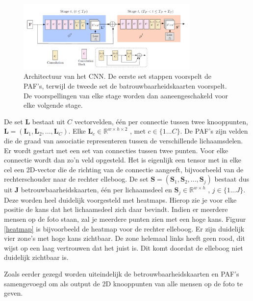 \documentclass[a4paper,twoside,kulak]{kulakreport}
\begin{document}
\begin{figure}[H]
	\centering
	\label{algoritme}
	\includegraphics[width=0.8\textwidth]{algoritme_architectuur}
	\caption{Architectuur van het CNN. De eerste set stappen voorspelt de PAF's, terwijl de tweede set de batrouwbaarheidskaarten voorspelt. De voorspellingen van elke stage worden dan aaneengeschakeld voor elke volgende stage. \cite{cao2019openpose}}
\end{figure}

De set \textbf{L} bestaat uit $C$ vectorvelden, één per connectie tussen twee knooppunten, $\textbf{L} = (\textbf{L}_1,\textbf{L}_2,...,\textbf{L}_C)$. Elke $\textbf{L}_c \in \mathbb{R}^{w \times h \times 2}$ , met $c \in \{1...C\}.$ De PAF’s  zijn velden die de graad van associatie representeren tussen de verschillende lichaamsdelen. Er wordt gestart met een set van connecties tussen twee punten. Voor elke connectie wordt dan zo’n veld opgesteld. Het is eigenlijk een tensor met in elke cel een 2D-vector die de richting van de connectie aangeeft, bijvoorbeeld van de rechterschouder naar de rechter elleboog.
De set $\textbf{S} = (\textbf{S}_1,\textbf{S}_2,...,\textbf{S}_j)$ bestaat dus uit $\textbf{J}$ betrouwbaarheidskaarten, één per lichaamsdeel en $\textbf{S}_j \in \mathbb{R} ^{w \times h}$ , $j \in \{1...J\}$.
Deze worden heel duidelijk voorgesteld met heatmaps. Hierop zie je voor elke positie de kans dat het lichaamsdeel zich daar bevindt. Indien er meerdere mensen op de foto staan, zal je meerdere punten zien met een hoge kans. Figuur \ref{heatmap} is bijvoorbeeld de heatmap voor de rechter elleboog. Er zijn duidelijk vier zone's met hoge kans zichtbaar. De zone helemaal links heeft geen rood, dit wijst op een laag vertrouwen dat het juist is. Dit komt doordat de elleboog niet duidelijk zichtbaar is.

Zoals eerder gezegd worden uiteindelijk de betrouwbaarheidskaarten en PAF's samengevoegd om als output de 2D knooppunten van alle mensen op de foto te geven.
\end{document}
